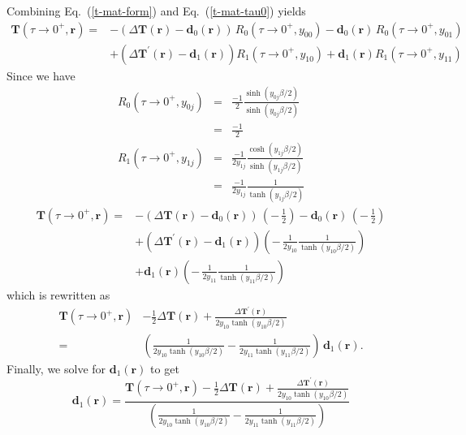Combining Eq.~(\ref{t-mat-form}) and Eq.~(\ref{t-mat-tau0}) yields
\begin{equation}
\begin{split}
\mathbf{T}(\tau \to 0^+, \mathbf{r}) = &
 -(\Delta \mathbf{T}(\mathbf{r})
- \mathbf{d}_0(\mathbf{r}))\,R_0(\tau \to 0^+, y_{00}) -
 \mathbf{d}_0(\mathbf{r}) \,R_0(\tau \to 0^+, y_{01}) \\
& + (\Delta \mathbf{T}^{\prime}(\mathbf{r}) - \mathbf{d}_1(\mathbf{r}))
R_1(\tau \to 0^+, y_{10}) + \mathbf{d}_1(\mathbf{r}) 
R_1(\tau \to 0^+, y_{11})
\end{split}
\end{equation}
Since we have
\begin{eqnarray}
R_0(\tau \to 0^+, y_{0j}) & = & \frac{-1}{2}\frac{\sinh(y_{0j} \beta/2)}
{\sinh(y_{0j} \beta/2)} \\
& = & \frac{-1}{2} \\
R_1(\tau \to 0^+, y_{1j}) & = & \frac{-1}{2 y_{1j}}
\frac{\cosh(y_{1j} \beta /2)}{\sinh(y_{1j} \beta /2)} \\
& = & \frac{-1}{2 y_{1j}}\frac{1}{\tanh(y_{1j} \beta /2)}
\end{eqnarray}
\begin{equation}
\begin{split}
\mathbf{T}(\tau \to 0^+, \mathbf{r}) = &
 -(\Delta \mathbf{T}(\mathbf{r})
- \mathbf{d}_0(\mathbf{r}))\,\left(-\,\frac{1}{2}\right) -
 \mathbf{d}_0(\mathbf{r}) \,\left(-\,\frac{1}{2}\right) \\
& + (\Delta \mathbf{T}^{\prime}(\mathbf{r}) - \mathbf{d}_1(\mathbf{r}))
\left(-\,\frac{1}{2 y_{10}} \frac{1}{\tanh(y_{10} \beta/2)}\right) \\
& + \mathbf{d}_1(\mathbf{r}) 
\left(-\,\frac{1}{2 y_{11}} \frac{1}{\tanh(y_{11} \beta/2)}\right)
\end{split}
\end{equation}
which is rewritten as
\begin{equation}
\begin{split}
\mathbf{T}(\tau \to 0^+, \mathbf{r})  &
- \frac{1}{2} \Delta \mathbf{T}(\mathbf{r}) + 
\frac{\Delta \mathbf{T}^{\prime}(\mathbf{r})}
{2y_{10} \tanh(y_{10} \beta /2)} \\
= & \left( \frac{1}{2y_{10} \tanh(y_{10} \beta /2)} -
\frac{1}{2y_{11} \tanh(y_{11} \beta /2)} \right) \,\mathbf{d}_1(\mathbf{r}).
\end{split}
\end{equation}
Finally, we solve for $\mathbf{d}_1(\mathbf{r})$ to get
\begin{equation}
\mathbf{d}_1(\mathbf{r}) = 
\frac{
\mathbf{T}(\tau \to 0^+, \mathbf{r}) 
- \frac{1}{2} \Delta \mathbf{T}(\mathbf{r}) + 
{\displaystyle \frac{\Delta \mathbf{T}^{\prime}(\mathbf{r})}
{2y_{10} \tanh(y_{10} \beta /2)}}
}
{\displaystyle \left(
 \frac{1}{2y_{10} \tanh(y_{10} \beta /2)} -
\frac{1}{2y_{11} \tanh(y_{11} \beta /2)} \right)
}
\end{equation}

